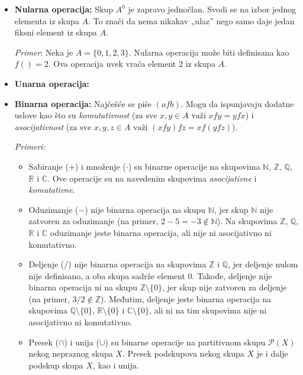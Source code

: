 \documentclass[a4paper,12pt]{article}
\begin{document}
\begin{itemize}
  \item \textbf{Nularna operacija:}
    Skup \( A^0 \) je zapravo jednočlan. Svodi se na izbor jednog elementa iz skupa \(A\). To znači da nema nikakav „ulaz” nego samo daje jedan fiksni element iz skupa \(A\).

    \emph{Primer}: Neka je \( A = \{0, 1, 2, 3\} \). Nularna operacija može biti definisana kao \( f() = 2 \). Ova operacija uvek vraća element \( 2 \) iz skupa \( A \).

  \item \textbf{Unarna operacija:}
  \item \textbf{Binarna operacija:}
    Najčešće se piše \( (a f b ) \). Mogu da ispunjavaju dodatne uslove kao što su \emph{komutativnost} (\( \text{za sve } x, y \in A \text{ važi } x f y = y f x \)) i \emph{asocijativnost} (\( \text{za sve } x, y, z \in A \text{ važi } (x f y) f z = x f (y f z) \)).

    \emph{Primeri:}
   \begin{itemize}
  \item Sabiranje (\( + \)) i množenje (\( \cdot \)) su binarne operacije na skupovima
  \( \mathbb{N} \), \( \mathbb{Z} \), \( \mathbb{Q} \), \( \mathbb{R} \) i \( \mathbb{C} \).
  Ove operacije su na navedenim skupovima \emph{asocijativne} i \emph{komutativne}.

  \item Oduzimanje (\( - \)) nije binarna operacija na skupu \( \mathbb{N} \), jer skup
  \( \mathbb{N} \) nije zatvoren za oduzimanje (na primer, \( 2 - 5 = -3 \notin \mathbb{N} \)).
  Na skupovima \( \mathbb{Z} \), \( \mathbb{Q} \), \( \mathbb{R} \) i \( \mathbb{C} \)
  oduzimanje jeste binarna operacija, ali nije ni asocijativno ni komutativno.

  \item Deljenje (\( / \)) nije binarna operacija na skupovima \( \mathbb{Z} \) i
  \( \mathbb{Q} \), jer deljenje nulom nije definisano, a oba skupa sadrže element \( 0 \).
  Takođe, deljenje nije binarna operacija ni na skupu \( \mathbb{Z} \setminus \{0\} \),
  jer skup nije zatvoren za deljenje (na primer, \( 3 / 2 \notin \mathbb{Z} \)).
  Međutim, deljenje jeste binarna operacija na skupovima
  \( \mathbb{Q} \setminus \{0\} \), \( \mathbb{R} \setminus \{0\} \) i
  \( \mathbb{C} \setminus \{0\} \), ali ni na tim skupovima nije ni asocijativno
  ni komutativno.
  \item Presek (\(\cap\)) i unija (\(\cup\)) su binarne operacije na partitivnom skupu
\(\mathcal{P}(X)\) nekog nepraznog skupa \(X\). Presek podskupova nekog skupa \(X\) je i
    dalje podskup skupa \(X\), kao i unija.


\end{itemize}
\end{itemize}
\end{document}
